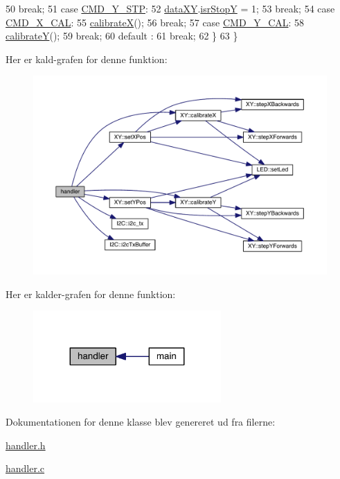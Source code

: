 \begin{DoxyCode}
50       \textcolor{keywordflow}{break};
51     \textcolor{keywordflow}{case} \hyperlink{handler_8h_a83ab3037b2c91ea010b2d8c47acd5434}{CMD\_Y\_STP}:
52       \hyperlink{data_8h_a89d7998a721b3f36f9f4131e7a5e42d2}{dataXY}.\hyperlink{data_8h_a92ec85e6a09f5dc7ed83640f1810c4bb}{isrStopY} = 1;
53       \textcolor{keywordflow}{break};
54     \textcolor{keywordflow}{case} \hyperlink{handler_8h_a5edf35288955238e1090f2367f96e828}{CMD\_X\_CAL}:
55       \hyperlink{xy_8h_a7930e37ef31e3575388f1bce7870872c}{calibrateX}();
56       \textcolor{keywordflow}{break};
57     \textcolor{keywordflow}{case} \hyperlink{handler_8h_a2b2db51eef91dc2aa5586d0817838ef2}{CMD\_Y\_CAL}:
58       \hyperlink{xy_8h_ab52d33c452fb38ec0fb6c9ad77031ccd}{calibrateY}();
59       \textcolor{keywordflow}{break};
60     \textcolor{keywordflow}{default} :
61       \textcolor{keywordflow}{break};
62   \}
63 \}
\end{DoxyCode}


Her er kald-\/grafen for denne funktion\+:
\nopagebreak
\begin{figure}[H]
\begin{center}
\leavevmode
\includegraphics[width=350pt]{d2/d01/class_handler_af5be5b016b862943cd22504490acc8f4_cgraph}
\end{center}
\end{figure}




Her er kalder-\/grafen for denne funktion\+:
\nopagebreak
\begin{figure}[H]
\begin{center}
\leavevmode
\includegraphics[width=203pt]{d2/d01/class_handler_af5be5b016b862943cd22504490acc8f4_icgraph}
\end{center}
\end{figure}




Dokumentationen for denne klasse blev genereret ud fra filerne\+:\begin{DoxyCompactItemize}
\item 
\hyperlink{handler_8h}{handler.\+h}\item 
\hyperlink{handler_8c}{handler.\+c}\end{DoxyCompactItemize}
